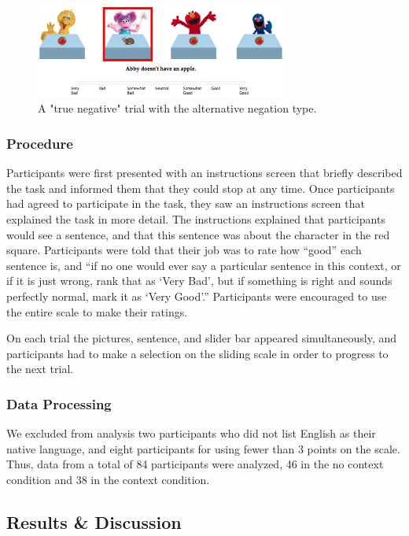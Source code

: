 \documentclass[10pt,letterpaper]{article}
\begin{document}
\begin{figure}[t]
\begin{center} 
\includegraphics[width=3.25in]{figures/example.png}
\caption{\label{fig:trial} A "true negative" trial with the alternative negation type.}
\vspace{-5mm}
\end{center} 
\end{figure}

\subsubsection{Procedure}
Participants were first presented with an instructions screen that briefly described the task and informed them that they could stop at any time.  Once participants had agreed to participate in the task, they saw an instructions screen that explained the task in more detail.  The instructions explained that participants would see a sentence, and that this sentence was about the character in the red square.  Participants were told that their job was to rate how ``good'' each sentence is, and ``if no one would ever say a particular sentence in this context, or if it is just wrong, rank that as `Very Bad', but if something is right and sounds perfectly normal, mark it as `Very Good'.''  Participants were encouraged to use the entire scale to make their ratings.

On each trial the pictures, sentence, and slider bar appeared simultaneously, and participants had to make a selection on the sliding scale in order to progress to the next trial.  

\subsubsection{Data Processing}
We excluded from analysis two participants who did not list English as their native language, and eight participants for using fewer than 3 points on the scale.  Thus, data from a total of 84 participants were analyzed, 46 in the no context condition and 38 in the context condition.  

\subsection{Results \& Discussion}
\end{document}
